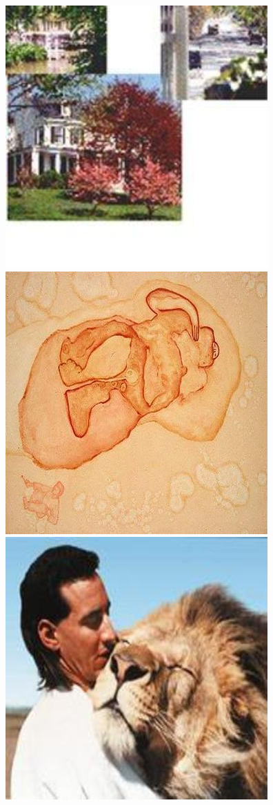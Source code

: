\documentclass[oneside,a4paper,english,links]{amca}
\begin{document}
\begin{figure}[htb]
\centering
\includegraphics[scale=0.28]{exps/100sample/res/image_0004}
\includegraphics[scale=0.28]{exps/100sample/res/image_0019}
\includegraphics[scale=0.28]{exps/100sample/res/image_0027}

\end{figure}
\end{document}
